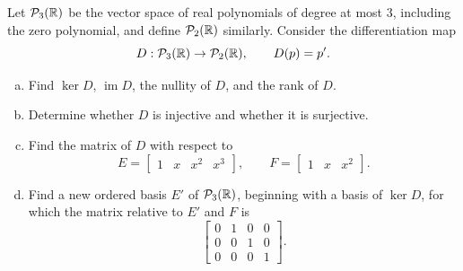 \begin{exercise}
  \label{ex:hw04:polynomial-differentiation}
  Let \(\mathcal P_3(\mathbb{R})\) be the vector space of real polynomials of
  degree at most \(3\), including the zero polynomial, and define
  \(\mathcal P_2(\mathbb{R})\) similarly. Consider the differentiation map
  \[
    D:\mathcal P_3(\mathbb{R})\to\mathcal P_2(\mathbb{R}),\qquad D(p)=p'.
  \]
  \begin{enumerate}[(a)][2]
    \item Find \(\ker D\), \(\operatorname{im}D\), the nullity of \(D\),
      and the rank of \(D\).
    \item Determine whether \(D\) is injective and whether it is surjective.
    \item Find the matrix of \(D\) with respect to
      \[
        E=\begin{bmatrix}1&x&x^2&x^3\end{bmatrix},
        \qquad F=\begin{bmatrix}1&x&x^2\end{bmatrix}.
      \]
    \item Find a new ordered basis \(E'\) of \(\mathcal P_3(\mathbb{R})\),
      beginning with a basis of \(\ker D\), for which the matrix relative
      to \(E'\) and \(F\) is
      \[
        \begin{bmatrix}
          0&1&0&0\\
          0&0&1&0\\
          0&0&0&1
        \end{bmatrix}.
      \]
  \end{enumerate}
\end{exercise}
